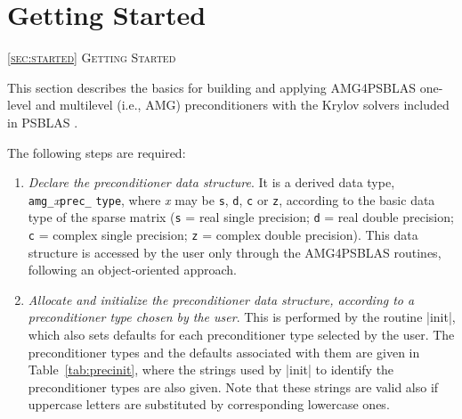 \section{Getting Started\label{sec:started}}
         {\textsc{\ref{sec:started} Getting Started}}

This section  describes the basics for building and applying
AMG4PSBLAS one-level and multilevel (i.e., AMG) preconditioners with
the Krylov solvers included in PSBLAS \cite{PSBLASGUIDE}.

The following steps are required:
\begin{enumerate}
\item \emph{Declare the preconditioner data structure}. It is a derived data type,
  \verb|amg_|\-\emph{x}\verb|prec_| \verb|type|, where \emph{x} may be
  \verb|s|, \verb|d|, \verb|c| or \verb|z|, according to the basic
  data type of the sparse matrix (\verb|s| = real single precision;
  \verb|d| = real double precision; 	\verb|c| = complex single
  precision; \verb|z| = complex double precision). 	This data
  structure is accessed by the user only through the AMG4PSBLAS
  routines, 	following an object-oriented approach.
\item \emph{Allocate and initialize the preconditioner data structure,
    according to a preconditioner type chosen by the user}. This is
  performed by the routine  	\fortinline|init|, which also sets
  defaults for each preconditioner 	type selected by the user. The
  preconditioner types and the defaults associated 	with them are
  given in Table~\ref{tab:precinit}, where the strings used by
  \fortinline|init| to identify the preconditioner types are also
  given. 	Note that these strings are valid also if uppercase
  letters are substituted by 	corresponding lowercase ones. 


\end{enumerate}
